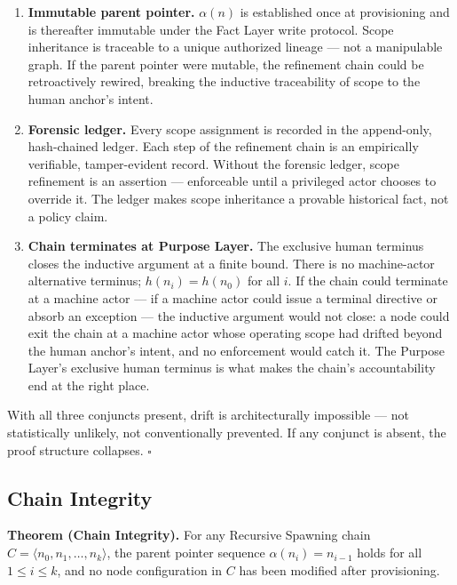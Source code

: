 \begin{enumerate}
    \item[(1)] \textbf{Immutable parent pointer.} $\alpha(n)$ is established once at provisioning and is thereafter immutable under the Fact Layer write protocol. Scope inheritance is traceable to a unique authorized lineage — not a manipulable graph. If the parent pointer were mutable, the refinement chain could be retroactively rewired, breaking the inductive traceability of scope to the human anchor's intent.

    \item[(2)] \textbf{Forensic ledger.} Every scope assignment is recorded in the append-only, hash-chained ledger. Each step of the refinement chain is an empirically verifiable, tamper-evident record. Without the forensic ledger, scope refinement is an assertion — enforceable until a privileged actor chooses to override it. The ledger makes scope inheritance a provable historical fact, not a policy claim.

    \item[(3)] \textbf{Chain terminates at Purpose Layer.} The exclusive human terminus closes the inductive argument at a finite bound. There is no machine-actor alternative terminus; $h(n_i) = h(n_0)$ for all $i$. If the chain could terminate at a machine actor — if a machine actor could issue a terminal directive or absorb an exception — the inductive argument would not close: a node could exit the chain at a machine actor whose operating scope had drifted beyond the human anchor's intent, and no enforcement would catch it. The Purpose Layer's exclusive human terminus is what makes the chain's accountability end at the right place.
\end{enumerate}

With all three conjuncts present, drift is architecturally impossible — not statistically unlikely, not conventionally prevented. If any conjunct is absent, the proof structure collapses. $\square$

\subsection{Chain Integrity}
\label{sec:rs-chain-integrity}

\medskip
\noindent\textbf{Theorem (Chain Integrity).} For any Recursive Spawning chain $C = \langle n_0, n_1, \ldots, n_k \rangle$, the parent pointer sequence $\alpha(n_i) = n_{i-1}$ holds for all $1 \leq i \leq k$, and no node configuration in $C$ has been modified after provisioning.

